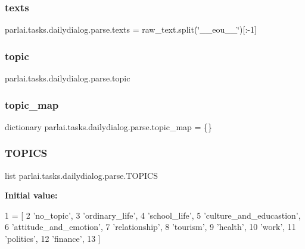 \subsubsection{\texorpdfstring{texts}{texts}}
{\footnotesize\ttfamily parlai.\+tasks.\+dailydialog.\+parse.\+texts = raw\+\_\+text.\+split(\char`\"{}\+\_\+\+\_\+eou\+\_\+\+\_\+\char`\"{})\mbox{[}\+:-\/1\mbox{]}}

\mbox{\label{namespaceparlai_1_1tasks_1_1dailydialog_1_1parse_a50ad2692c4cc4e33f1a5303dc3394ebe}} 
\subsubsection{\texorpdfstring{topic}{topic}}
{\footnotesize\ttfamily parlai.\+tasks.\+dailydialog.\+parse.\+topic}

\mbox{\label{namespaceparlai_1_1tasks_1_1dailydialog_1_1parse_a1257c1312ee37cbf84fd9892736a6282}} 
\subsubsection{\texorpdfstring{topic\+\_\+map}{topic\_map}}
{\footnotesize\ttfamily dictionary parlai.\+tasks.\+dailydialog.\+parse.\+topic\+\_\+map = \{\}}

\mbox{\label{namespaceparlai_1_1tasks_1_1dailydialog_1_1parse_a567cf2e7cf2a587676683cf7a0860ac9}} 
\subsubsection{\texorpdfstring{T\+O\+P\+I\+CS}{TOPICS}}
{\footnotesize\ttfamily list parlai.\+tasks.\+dailydialog.\+parse.\+T\+O\+P\+I\+CS}

{\bfseries Initial value\+:}
\begin{DoxyCode}
1 =  [
2     \textcolor{stringliteral}{'no\_topic'},
3     \textcolor{stringliteral}{'ordinary\_life'},
4     \textcolor{stringliteral}{'school\_life'},
5     \textcolor{stringliteral}{'culture\_and\_educastion'},
6     \textcolor{stringliteral}{'attitude\_and\_emotion'},
7     \textcolor{stringliteral}{'relationship'},
8     \textcolor{stringliteral}{'tourism'},
9     \textcolor{stringliteral}{'health'},
10     \textcolor{stringliteral}{'work'},
11     \textcolor{stringliteral}{'politics'},
12     \textcolor{stringliteral}{'finance'},
13 ]
\end{DoxyCode}
